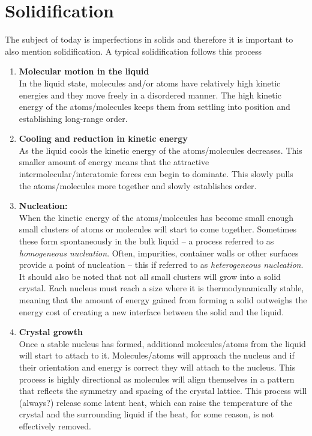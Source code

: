 
\section{Solidification}
The subject of today is imperfections in solids and therefore it is important to also mention solidification. A typical solidification follows this process
\begin{enumerate}
  \item \textbf{Molecular motion in the liquid} \\
    In the liquid state, molecules and/or atoms have relatively high kinetic energies and they move freely in a disordered manner. The high kinetic energy of the atoms/molecules keeps them from settling into position and establishing long-range order.
  \item \textbf{Cooling and reduction in kinetic energy} \\
    As the liquid cools the kinetic energy of the atoms/molecules decreases. This smaller amount of energy means that the attractive intermolecular/interatomic forces can begin to dominate. This slowly pulls the atoms/molecules more together and slowly establishes order.
  \item \textbf{Nucleation:} \\
    When the kinetic energy of the atoms/molecules has become small enough small clusters of atoms or molecules will start to come together. Sometimes these form spontaneously in the bulk liquid -- a process referred to as \textit{homogeneous nucleation}. Often, impurities, container walls or other surfaces provide a point of nucleation -- this if referred to as \textit{heterogeneous nucleation}. It should also be noted that not all small clusters will grow into a solid crystal. Each nucleus must reach a size where it is thermodynamically stable, meaning that the amount of energy gained from forming a solid outweighs the energy cost of creating a new interface between the solid and the liquid.
  \item \textbf{Crystal growth} \\
    Once a stable nucleus has formed, additional molecules/atoms from the liquid will start to attach to it. Molecules/atoms will approach the nucleus and if their orientation and energy is correct they will attach to the nucleus. This process is highly directional as molecules will align themselves in a pattern that reflects the symmetry and spacing of the crystal lattice. This process will (always?) release some latent heat, which can raise the temperature of the crystal and the surrounding liquid if the heat, for some reason, is not effectively removed.

\end{enumerate}
